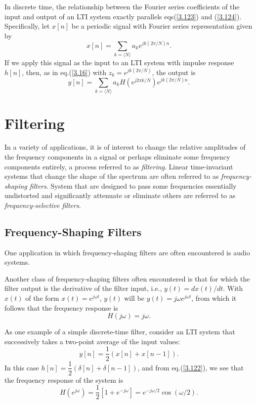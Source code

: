 \documentclass[a4paper,twoside]{book}
\begin{document}
In discrete time, the relationship between the Fourier series coefficients of the input and output of an LTI system exactly parallels eqs\;(\ref{3.123}) and (\ref{3.124}). Specifically, let $x[n]$ be a periodic signal with Fourier series representation given by $$x[n]=\sum_{k=\langle N\rangle}a_ke^{jk(2\pi/N)n}.$$ If we apply this signal as the input to an LTI system with impulse response $h[n]$, then, as in eq.\;(\ref{3.16}) with $z_k=e^{jk(2\pi/N)}$, the output is
\begin{equation}
    y[n]=\sum_{k=\langle N\rangle}a_{k}H(e^{j2\pi k/N})e^{jk(2\pi/N)n}.
    \label{3.131}
\end{equation}

\section{Filtering}
\label{section:3.9}

In a variety of applications, it is of interest to change the relative amplitudes of the frequency components in a signal or perhaps eliminate some frequency components entirely, a process referred to as \textit{filtering}. Linear time-invariant systems that change the shape of the spectrum are often referred to as \textit{frequency-shaping filters}. System that are designed to pass some frequencies essentially undistorted and significantly attenuate or eliminate others are referred to as \textit{frequency-selective filters}.

\subsection{Frequency-Shaping Filters}

One application in which frequency-shaping filters are often encountered is audio systems.

Another class of frequency-shaping filters often encountered is that for which the filter output is the derivative of the filter input, i.e., $y(t)=dx(t)/dt$. With $x(t)$ of the form $x(t)=e^{j\omega t}$, $y(t)$ will be $y(t)=j\omega e^{j\omega t}$, from which it follows that the frequency response is
\begin{equation}
    H(j\omega)=j\omega.
    \label{3.137}
\end{equation}

As one example of a simple discrete-time filter, consider an LTI system that successively takes a two-point average of the input values:
\begin{equation}
    y[n]=\dfrac12(x[n]+x[n-1]).
    \label{3.138}
\end{equation}
In this case $h[n]=\dfrac12(\delta[n]+\delta[n-1])$, and from eq.\;(\ref{3.122}), we see that the frequency response of the system is
\begin{equation}
    H(e^{j\omega})=\frac12[1+e^{-j\omega}]=e^{-j\omega/2}\cos(\omega/2).
    \label{3.139}
\end{equation}
\end{document}
